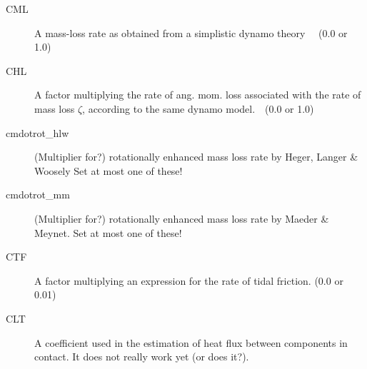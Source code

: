 \begin{description}
\item[CML]\hypertarget{cml}{} A mass-loss rate as obtained from a simplistic dynamo theory  \ \ (0.0 or 1.0)
\item[CHL]\hypertarget{chl}{} A factor multiplying the rate of ang. mom. loss associated with the rate of mass loss $\zeta$, according to the same dynamo model.\ \ (0.0 or 1.0)
\end{description}

\begin{description}
\item[cmdotrot\_hlw]\hypertarget{cmdotrot_hlw}{} (Multiplier for?) rotationally enhanced mass loss rate by Heger, Langer \& Woosely Set at most one of these!
\item[cmdotrot\_mm]\hypertarget{cmdotrot_mm}{} (Multiplier for?) rotationally enhanced mass loss rate by Maeder \& Meynet.  Set at most one of these!
\end{description}

\begin{description}
\item[CTF]\hypertarget{ctf}{} A factor multiplying an expression for the rate of tidal friction. (0.0 or 0.01)
\item[CLT]\hypertarget{clt}{} A coefficient used in the estimation of heat flux between components in contact. It does not really work yet (or does it?).
\end{description}

